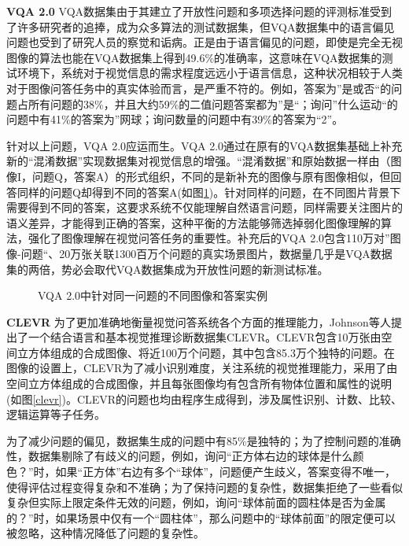 \textbf{VQA 2.0}
VQA数据集由于其建立了开放性问题和多项选择问题的评测标准受到了许多研究者的追捧，成为众多算法的测试数据集，但VQA数据集中的语言偏见问题也受到了研究人员的察觉和诟病。正是由于语言偏见的问题，即使是完全无视图像的算法也能在VQA数据集上得到49.6\%的准确率，这意味在VQA数据集的测试环境下，系统对于视觉信息的需求程度远远小于语言信息，这种状况相较于人类对于图像问答任务中的真实体验而言，是严重不符的。例如，答案为”是或否“的问题占所有问题的38\%，并且大约59\%的二值问题答案都为”是“；询问”什么运动“的问题中有41\%的答案为”网球；询问数量的问题中有39\%的答案为“2”。

针对以上问题，VQA 2.0应运而生。VQA 2.0通过在原有的VQA数据集基础上补充新的“混淆数据”实现数据集对视觉信息的增强。“混淆数据”和原始数据一样由（图像I，问题Q，答案A）的形式组织，不同的是新补充的图像与原有图像相似，但回答同样的问题Q却得到不同的答案A(如图\ref{vqa2})。针对同样的问题，在不同图片背景下需要得到不同的答案，这要求系统不仅能理解自然语言问题，同样需要关注图片的语义差异，才能得到正确的答案，这种平衡的方法能够筛选掉弱化图像理解的算法，强化了图像理解在视觉问答任务的重要性。补充后的VQA 2.0包含110万对”图像-问题“、20万张关联1300百万个问题的真实场景图片，数据量几乎是VQA数据集的两倍，势必会取代VQA数据集成为开放性问题的新测试标准。
\begin{figure}[H]
	\centering
	\caption{VQA 2.0中针对同一问题的不同图像和答案实例}
	\label{vqa2}
\end{figure}

\textbf{CLEVR}
为了更加准确地衡量视觉问答系统各个方面的推理能力，Johnson等人提出了一个结合语言和基本视觉推理诊断数据集CLEVR。CLEVR包含10万张由空间立方体组成的合成图像、将近100万个问题，其中包含85.3万个独特的问题。在图像的设置上，CLEVR为了减小识别难度，关注系统的视觉推理能力，采用了由空间立方体组成的合成图像，并且每张图像均有包含所有物体位置和属性的说明(如图\ref{clevr})。CLEVR的问题也均由程序生成得到，涉及属性识别、计数、比较、逻辑运算等子任务。

为了减少问题的偏见，数据集生成的问题中有85\%是独特的；为了控制问题的准确性，数据集剔除了有歧义的问题，例如，询问“正方体右边的球体是什么颜色？”时，如果“正方体”右边有多个“球体”，问题便产生歧义，答案变得不唯一，使得评估过程变得复杂和不准确；为了保持问题的复杂性，数据集拒绝了一些看似复杂但实际上限定条件无效的问题，例如，询问“球体前面的圆柱体是否为金属的？”时，如果场景中仅有一个“圆柱体”，那么问题中的“球体前面”的限定便可以被忽略，这种情况降低了问题的复杂性。


